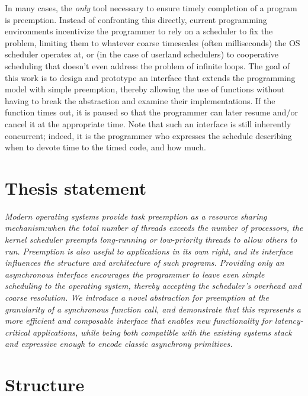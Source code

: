\documentclass[12pt,letterpaper,openright]{report}
\begin{document}
In many cases, the \textit{only} tool necessary to ensure timely completion of a
program is preemption.  Instead of confronting this directly, current programming
environments incentivize the programmer to rely on a scheduler to fix the problem,
limiting them to whatever coarse timescales (often milliseconds) the OS scheduler
operates at, or (in the case of userland schedulers) to cooperative scheduling
that doesn't even address the problem of infinite loops.  The goal of this work is to
design and prototype an interface that extends the programming model with simple
preemption, thereby allowing the use of functions without having to break the
abstraction and examine their implementations.  If the function times out, it is
paused so that the programmer can later resume and/or cancel it at the appropriate
time.  Note that such an interface is still inherently concurrent; indeed, it is the
programmer who expresses the schedule describing when to devote time to the timed
code, and how much.


\section{Thesis statement}

\textit{Modern operating systems provide task preemption
as a resource sharing mechanism:\@ when the total number of
threads exceeds the number of processors, the kernel scheduler preempts long-running
or low-priority threads to allow others to run.  Preemption is also useful to
applications in its own right, and its interface
influences the structure and architecture of such programs.
Providing only an asynchronous interface encourages the programmer to leave even
simple scheduling to the operating system, thereby accepting the scheduler's overhead
and coarse resolution.  We introduce a novel
abstraction for preemption at the granularity of a synchronous function call, and
demonstrate that this represents a more efficient and composable interface that
enables new functionality for latency-critical applications, while being both
compatible with the existing systems stack and expressive enough
to encode classic asynchrony primitives.
}


\section{Structure}
\end{document}
